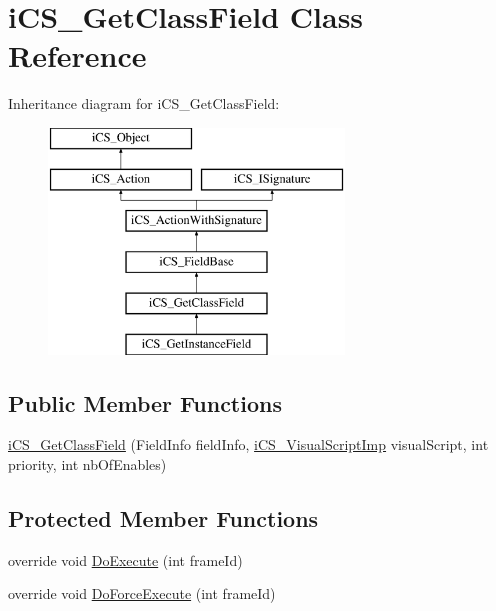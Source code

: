 \hypertarget{classi_c_s___get_class_field}{\section{i\+C\+S\+\_\+\+Get\+Class\+Field Class Reference}
\label{classi_c_s___get_class_field}
}
Inheritance diagram for i\+C\+S\+\_\+\+Get\+Class\+Field\+:\begin{figure}[H]
\begin{center}
\leavevmode
\includegraphics[height=6.000000cm]{classi_c_s___get_class_field}
\end{center}
\end{figure}
\subsection*{Public Member Functions}
\begin{DoxyCompactItemize}
\item 
\hyperlink{classi_c_s___get_class_field_a34db7ab7152a0c18ace05537a87c1314}{i\+C\+S\+\_\+\+Get\+Class\+Field} (Field\+Info field\+Info, \hyperlink{classi_c_s___visual_script_imp}{i\+C\+S\+\_\+\+Visual\+Script\+Imp} visual\+Script, int priority, int nb\+Of\+Enables)
\end{DoxyCompactItemize}
\subsection*{Protected Member Functions}
\begin{DoxyCompactItemize}
\item 
override void \hyperlink{classi_c_s___get_class_field_aebb57983ea1b5fd5f3d1ae56044c82ea}{Do\+Execute} (int frame\+Id)
\item 
override void \hyperlink{classi_c_s___get_class_field_a87fc9583f87318dfcf54cff3bcf3d590}{Do\+Force\+Execute} (int frame\+Id)
\end{DoxyCompactItemize}
